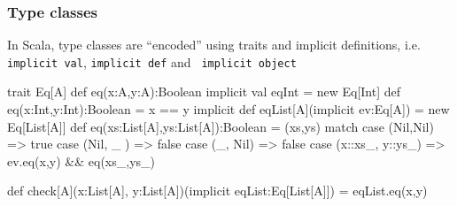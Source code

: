 \documentclass{beamer}
\newcommand{\beb}{\begin{exampleblock}}
\newcommand{\eeb}{\end{exampleblock}}
\begin{document}
\begin{frame}[fragile]
\frametitle{Type classes}
In Scala, type classes are ``encoded'' using traits and implicit
definitions, i.e. {\tt implicit val}, {\tt implicit def} and {\tt
  implicit object}
\beb{}
\begin{code}
trait Eq[A] {  def eq(x:A,y:A):Boolean }
implicit val eqInt = new Eq[Int] {
    def eq(x:Int,y:Int):Boolean =  x == y
}
implicit def eqList[A](implicit ev:Eq[A]) = 
  new Eq[List[A]] {
    def eq(xs:List[A],ys:List[A]):Boolean = 
      (xs,ys) match {
        case (Nil,Nil) => true
        case (Nil, _ ) => false
        case (_,  Nil) => false
        case (x::xs_, y::ys_) => ev.eq(x,y) && eq(xs_,ys_)
     }
}

def check[A](x:List[A], y:List[A])(implicit eqList:Eq[List[A]]) = 
   eqList.eq(x,y) 
\end{code}
\eeb
\end{frame}
\end{document}
